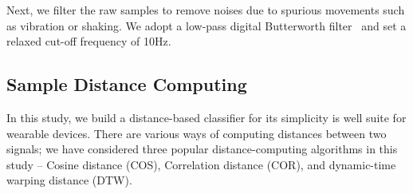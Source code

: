 Next, we filter the raw samples to remove noises due to spurious movements such as vibration or shaking.
We adopt a low-pass digital Butterworth
filter~\cite{challis1983design} and set a relaxed cut-off frequency of 10Hz.


\subsection{Sample Distance Computing}\label{subsec:distance}


In this study, we build a distance-based classifier for its simplicity is well suite for wearable devices. There are various ways of computing distances between two signals; we have considered three popular distance-computing algorithms in this study -- Cosine distance (COS), Correlation distance (COR), and dynamic-time warping distance (DTW).

